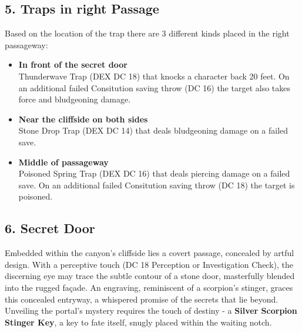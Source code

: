 \subsection*{5. Traps in right Passage}
{\entryfont
	Based on the location of the trap there are 3 different kinds placed in the right passageway:
	\begin{itemize}
		\item \textbf{In front of the secret door}\\
		Thunderwave Trap (DEX DC 18) that knocks a character back 20 feet. On an additional failed Consitution saving throw (DC 16) the target also takes  force and  bludgeoning damage.
		\item \textbf{Near the cliffside on both sides}\\
		Stone Drop Trap (DEX DC 14) that deals  bludgeoning damage on a failed save.
		\item \textbf{Middle of passageway}\\
		Poisoned Spring Trap (DEX DC 16) that deals  piercing damage on a failed save. On an additional failed Consitution saving throw (DC 18) the target is poisoned.
	\end{itemize}
}

\subsection*{6. Secret Door}
{\entryfont
	Embedded within the canyon's cliffside lies a covert passage, concealed by artful design. With a perceptive touch (DC 18 Perception or Investigation Check), the discerning eye may trace the subtle contour of a stone door, masterfully blended into the rugged façade. An engraving, reminiscent of a scorpion's stinger, graces this concealed entryway, a whispered promise of the secrets that lie beyond. Unveiling the portal's mystery requires the touch of destiny - a \textbf{Silver Scorpion Stinger Key}, a key to fate itself, snugly placed within the waiting notch.
}

\eject

